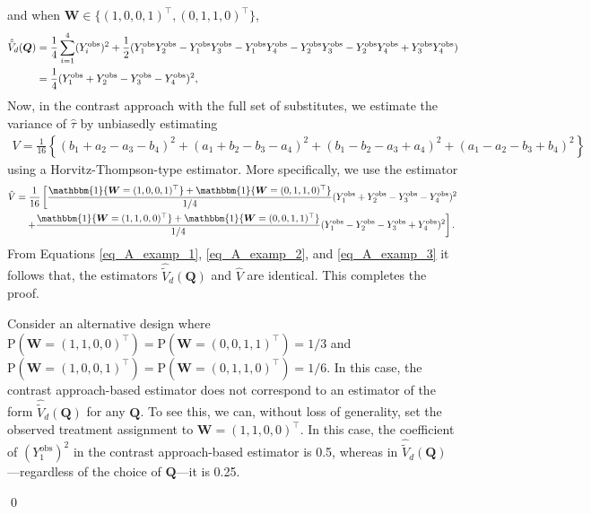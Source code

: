 \documentclass[12pt]{article}
\renewcommand{\Pr}{{\text{P}}}
\begin{document}
and when $\bm{W} \in \{(1,0,0,1)^\top, (0,1,1,0)^\top\}$, 
\begin{align}
    \hat{\Tilde{V}}_d(\bm{Q}) &= \frac{1}{4}\sum_{i=1}^{4}(Y^{\text{obs}}_i)^2 + \frac{1}{2}(Y^{\text{obs}}_1Y^{\text{obs}}_2 - Y^{\text{obs}}_1Y^{\text{obs}}_3 - Y^{\text{obs}}_1Y^{\text{obs}}_4 - Y^{\text{obs}}_2Y^{\text{obs}}_3 - Y^{\text{obs}}_2Y^{\text{obs}}_4 + Y^{\text{obs}}_3Y^{\text{obs}}_4) \nonumber \\
 & = \frac{1}{4} (Y^{\text{obs}}_1+Y^{\text{obs}}_2-Y^{\text{obs}}_3-Y^{\text{obs}}_4)^2, \label{eq_A_examp_2}
\end{align}
Now, in the contrast approach with the full set of substitutes, we estimate the variance of $\hat{\tau}$ by unbiasedly estimating
\begin{align}
    V = \frac{1}{16}\left\{(b_1 +a_2 - a_3 - b_4)^2 + (a_1 +b_2 - b_3 - a_4)^2 + (b_1-b_2-a_3+a_4)^2 + (a_1-a_2-b_3+b_4)^2\right\}
\end{align}
using a Horvitz-Thompson-type estimator. More specifically, we use the estimator
\begin{align}
 \hat{V} & = \frac{1}{16}\left[\frac{\mathbbm{1}\{\bm{W} = (1,0,0,1)^\top\} + \mathbbm{1}\{\bm{W} = (0,1,1,0)^\top\}}{1/4}(Y^{\text{obs}}_1+Y^{\text{obs}}_2-Y^{\text{obs}}_3-Y^{\text{obs}}_4)^2 \right. \nonumber \\
 & \quad \left. + \frac{\mathbbm{1}\{\bm{W} = (1,1,0,0)^\top\} + \mathbbm{1}\{\bm{W} = (0,0,1,1)^\top\}}{1/4}(Y^{\text{obs}}_1-Y^{\text{obs}}_2-Y^{\text{obs}}_3+Y^{\text{obs}}_4)^2 \right]. \label{eq_A_examp_3}
\end{align}
From Equations \ref{eq_A_examp_1}, \ref{eq_A_examp_2}, and \ref{eq_A_examp_3} it follows that, the estimators $\hat{\tilde{V}}_d(\bm{Q})$ and $\hat{V}$ are identical. This completes the proof.

Consider an alternative design where $\Pr(\bm{W} = (1,1,0,0)^\top) = \Pr(\bm{W} = (0,0,1,1)^\top) = 1/3$ and $\Pr(\bm{W} = (1,0,0,1)^\top) = \Pr(\bm{W} = (0,1,1,0)^\top) = 1/6$. In this case, the contrast approach-based estimator does not correspond to an estimator of the form $\hat{\tilde{V}}_d(\bm{Q})$ for any $\bm{Q}$. To see this, we can, without loss of generality, set the observed treatment assignment to $\bm{W} = (1, 1, 0, 0)^\top$. In this case, the coefficient of $(Y^{\text{obs}}_1)^2$ in the contrast approach-based estimator is 0.5, whereas in $\hat{\tilde{V}}_d(\bm{Q})$—regardless of the choice of $\bm{Q}$—it is 0.25.


\qed
\end{document}
